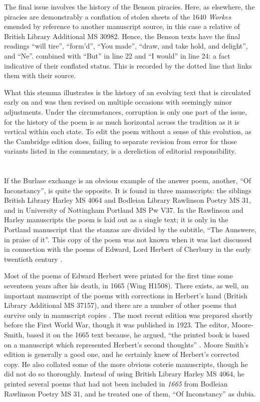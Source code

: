 \begin{paper}
The final issue involves the history of the Benson piracies. Here, as
elsewhere, the piracies are demonstrably a conflation of stolen sheets
of the 1640 \emph{Workes} emended by reference to another manuscript
source, in this case a relative of British Library Additional MS 30982.
Hence, the Benson texts have the final readings ``will tire'', ``form'd'',
``You made'', ``draw, and take hold, and delight'', and ``Ne''. combined with
``But'' in line 22 and ``I would'' in line 24: a fact indicative of their
conflated status. This is recorded by the dotted line that links them
with their source.

What this stemma illustrates is the history of an evolving text that is
circulated early on and was then revised on multiple occasions with
seemingly minor adjustments. Under the circumstances, corruption is only
one part of the issue, for the history of the poem is as much horizontal
across the tradition as it is vertical within each state. To edit the
poem without a sense of this evolution, as the Cambridge edition does,
failing to separate revision from error for those variants listed in the
commentary, is a dereliction of editorial responsibility.

\section*{}

If the Burlase exchange is an obvious example of the answer poem,
another, ``Of Inconstancy'', is quite the opposite. It is found in three
manuscripts: the siblings British Library Harley MS 4064 and Bodleian
Library Rawlinson Poetry MS 31, and in University of Nottingham Portland
MS Pw V37. In the Rawlinson and Harley manuscripts the poem is laid out
as a single text; it is only in the Portland manuscript that the stanzas
are divided by the subtitle, ``The Aunswere, in praise of it''. This copy
of the poem was not known when it was last discussed in connection with
the poems of Edward, Lord Herbert of Cherbury in the early twentieth
century \citep[119 and 167--68]{moore_smith_poems_1923}.

Most of the poems of Edward Herbert were printed for the first time
some seventeen years after his death, in 1665 (Wing H1508). There
exists, as well, an important manuscript of the poems with corrections
in Herbert's hand (British Library Additional MS 37157), and there are a
number of other poems that survive only in manuscript copies \citep[\textsc{ii}: 167--68]{beal_index_1980}. The most recent edition was prepared shortly
before the First World War, though it was published in 1923. The editor,
Moore-Smith, based it on the 1665 text because, he argued, ``the printed
book is based on a manuscript which represented Herbert's second
thoughts'' \citep[xxvii]{moore_smith_poems_1923}. Moore Smith's edition is generally
a good one, and he certainly knew of Herbert's corrected copy. He also
collated some of the more obvious coterie manuscripts, though he did not
do so thoroughly. Instead of using British Library Harley MS 4064, he
printed several poems that had not been included in \emph{1665} from
Bodleian Rawlinson Poetry MS 31, and he treated one of them, ``Of
Inconstancy'' as dubia.


\end{paper}
